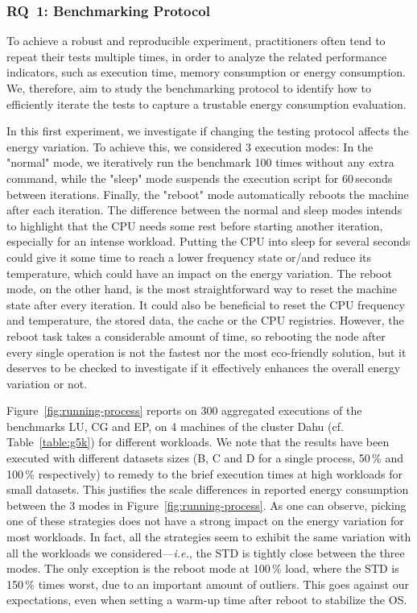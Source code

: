 \subsubsection{\textsc{RQ}~1: Benchmarking Protocol}
To achieve a robust and reproducible experiment, practitioners often tend to repeat their tests multiple times, in order to analyze the related performance indicators, such as execution time, memory consumption or energy consumption.
We, therefore, aim to study the benchmarking protocol to identify how to efficiently iterate the tests to capture a trustable energy consumption evaluation.

In this first experiment, we investigate if changing the testing protocol affects the energy variation.
To achieve this, we considered 3 execution modes:
In the \textsf{"normal"} mode, we iteratively run the benchmark 100 times without any extra command, while the \textsf{"sleep"} mode suspends the execution script for 60\,seconds between iterations.
Finally, the \textsf{"reboot"} mode automatically reboots the machine after each iteration.
The difference between the \textsf{normal} and \textsf{sleep} modes intends to highlight that the CPU needs some rest before starting another iteration, especially for an intense workload.
Putting the CPU into sleep for several seconds could give it some time to reach a lower frequency state or/and reduce its temperature, which could have an impact on the energy variation.
The \textsf{reboot} mode, on the other hand, is the most straightforward way to reset the machine state after every iteration.
It could also be beneficial to reset the CPU frequency and temperature, the stored data, the cache or the CPU registries.
However, the reboot task takes a considerable amount of time, so rebooting the node after every single operation is not the fastest nor the most eco-friendly solution, but it deserves to be checked to investigate if it effectively enhances the overall energy variation or not.

Figure~\ref{fig:running-process} reports on $300$ aggregated executions of the  benchmarks \textsf{LU}, \textsf{CG} and \textsf{EP}, on 4 machines of the cluster \textsf{Dahu} (cf. Table~\ref{table:g5k}) for different workloads.
We note that the results have been executed with different datasets sizes (\textsf{B}, \textsf{C} and \textsf{D} for a single process, 50\,\% and 100\,\% respectively) to remedy to the brief execution times at high workloads for small datasets.
This justifies the scale differences in reported energy consumption between the 3 modes in Figure~\ref{fig:running-process}.
As one can observe, picking one of these strategies does not have a strong impact on the energy variation for most workloads.
In fact, all the strategies seem to exhibit the same variation with all the workloads we considered---\emph{i.e.}, the STD is tightly close between the three modes.
The only exception is the \textsf{reboot} mode at 100\,\% load, where the STD is 150\,\% times worst, due to an important amount of outliers.
This goes against our expectations, even when setting a warm-up time after reboot to stabilize the OS.

